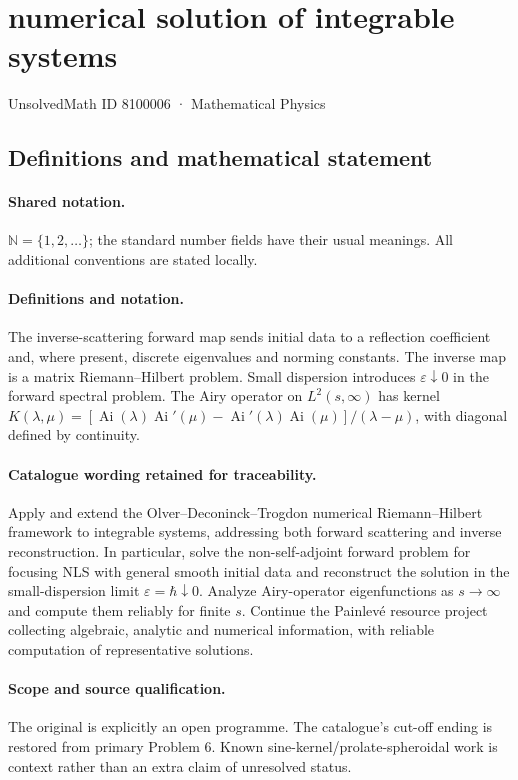 \documentclass[11pt]{article}
\begin{document}
\setcounter{section}{8100005}
\section{numerical solution of integrable systems}\label{8100006}
{\small UnsolvedMath ID 8100006 · Mathematical Physics}
\subsection{Definitions and mathematical statement}

\paragraph{Shared notation.}$\mathbb N=\{1,2,\ldots\}$; the standard number fields have their usual meanings. All additional conventions are stated locally.


\paragraph{Definitions and notation.}The inverse-scattering forward map sends initial data to a reflection coefficient and, where present, discrete eigenvalues and norming constants. The inverse map is a matrix Riemann--Hilbert problem. Small dispersion introduces $\varepsilon\downarrow0$ in the forward spectral problem. The Airy operator on $L^2(s,\infty)$ has kernel $K(\lambda,\mu)=[\operatorname{Ai}(\lambda)\operatorname{Ai}'(\mu)-\operatorname{Ai}'(\lambda)\operatorname{Ai}(\mu)]/(\lambda-\mu)$, with diagonal defined by continuity.

\paragraph{Catalogue wording retained for traceability.}
Apply and extend the Olver--Deconinck--Trogdon numerical Riemann--Hilbert framework to integrable systems, addressing both forward scattering and inverse reconstruction. In particular, solve the non-self-adjoint forward problem for focusing NLS with general smooth initial data and reconstruct the solution in the small-dispersion limit $\varepsilon=\hbar\downarrow0$. Analyze Airy-operator eigenfunctions as $s\to\infty$ and compute them reliably for finite $s$. Continue the Painlevé resource project collecting algebraic, analytic and numerical information, with reliable computation of representative solutions.
\paragraph{Scope and source qualification.}The original is explicitly an open programme. The catalogue’s cut-off ending is restored from primary Problem 6. Known sine-kernel/prolate-spheroidal work is context rather than an extra claim of unresolved status.
\end{document}
